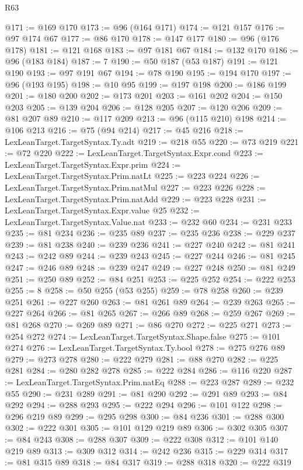 \begin{lexlean}{R63}
\begin{coremodule}
@171 := @169 @170
@173 := @96 (@164 @171)
@174 := @121 @157
@176 := @97 @174 @67
@177 := @86 @170
@178 := @147 @177
@180 := @96 (@176 @178)
@181 := @121 @168
@183 := @97 @181 @67
@184 := @132 @170
@186 := @96 (@183 @184)
@187 := 7
@190 := @50 @187 (@53 @187)
@191 := @121 @190
@193 := @97 @191 @67
@194 := @78 @190
@195 := @194 @170
@197 := @96 (@193 @195)
@198 := @10 @95
@199 := @197 @198
@200 := @186 @199
@201 := @180 @200
@202 := @173 @201
@203 := @161 @202
@204 := @150 @203
@205 := @139 @204
@206 := @128 @205
@207 := @120 @206
@209 := @81 @207 @89
@210 := @117 @209
@213 := @96 (@115 @210) @198
@214 := @106 @213
@216 := @75 (@94 @214)
@217 := @45 @216
@218 := LexLeanTarget.TargetSyntax.Ty.adt
@219 := @218 @55
@220 := @73 @219
@221 := @72 @220
@222 := LexLeanTarget.TargetSyntax.Expr.cond
@223 := LexLeanTarget.TargetSyntax.Expr.prim
@224 := LexLeanTarget.TargetSyntax.Prim.natLt
@225 := @223 @224
@226 := LexLeanTarget.TargetSyntax.Prim.natMul
@227 := @223 @226
@228 := LexLeanTarget.TargetSyntax.Prim.natAdd
@229 := @223 @228
@231 := LexLeanTarget.TargetSyntax.Expr.value @25
@232 := LexLeanTarget.TargetSyntax.Value.nat
@233 := @232 @60
@234 := @231 @233
@235 := @81 @234
@236 := @235 @89
@237 := @235 @236
@238 := @229 @237
@239 := @81 @238
@240 := @239 @236
@241 := @227 @240
@242 := @81 @241
@243 := @242 @89
@244 := @239 @243
@245 := @227 @244
@246 := @81 @245
@247 := @246 @89
@248 := @239 @247
@249 := @227 @248
@250 := @81 @249
@251 := @250 @89
@252 := @84 @251
@253 := @225 @252
@254 := @222 @253
@255 := 8
@258 := @50 @255 (@53 @255)
@259 := @78 @258
@260 := @239 @251
@261 := @227 @260
@263 := @81 @261 @89
@264 := @239 @263
@265 := @227 @264
@266 := @81 @265
@267 := @266 @89
@268 := @259 @267
@269 := @81 @268
@270 := @269 @89
@271 := @86 @270
@272 := @225 @271
@273 := @254 @272
@274 := LexLeanTarget.TargetSyntax.Shape.false
@275 := @101 @274
@276 := LexLeanTarget.TargetSyntax.Ty.bool
@278 := @275 @276 @89
@279 := @273 @278
@280 := @222 @279
@281 := @88 @270
@282 := @225 @281
@284 := @280 @282 @278
@285 := @222 @284
@286 := @116 @220
@287 := LexLeanTarget.TargetSyntax.Prim.natEq
@288 := @223 @287
@289 := @232 @55
@290 := @231 @289
@291 := @81 @290
@292 := @291 @89
@293 := @84 @292
@294 := @288 @293
@295 := @222 @294
@296 := @101 @122
@298 := @296 @219 @89
@299 := @295 @298
@300 := @84 @236
@301 := @288 @300
@302 := @222 @301
@305 := @101 @129 @219 @89
@306 := @302 @305
@307 := @84 @243
@308 := @288 @307
@309 := @222 @308
@312 := @101 @140 @219 @89
@313 := @309 @312
@314 := @242 @236
@315 := @229 @314
@317 := @81 @315 @89
@318 := @84 @317
@319 := @288 @318
@320 := @222 @319

\end{coremodule}
\end{lexlean}
